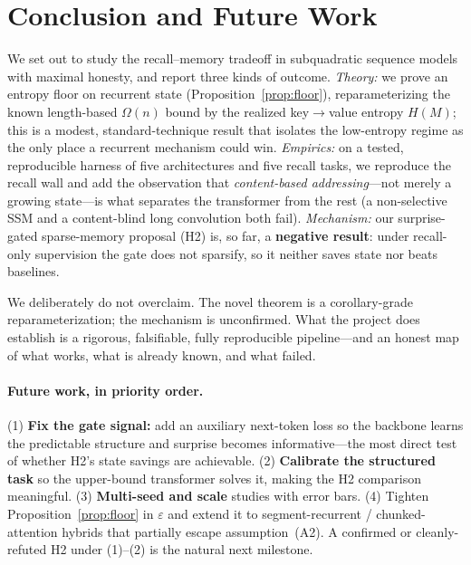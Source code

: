 \section{Conclusion and Future Work}
\label{sec:conclusion}

We set out to study the recall--memory tradeoff in subquadratic sequence models with maximal
honesty, and report three kinds of outcome. \emph{Theory:} we prove an entropy floor on recurrent
state (Proposition~\ref{prop:floor}), reparameterizing the known length-based $\Omega(n)$ bound by
the realized key$\rightarrow$value entropy $H(M)$; this is a modest, standard-technique result that
isolates the low-entropy regime as the only place a recurrent mechanism could win. \emph{Empirics:}
on a tested, reproducible harness of five architectures and five recall tasks, we reproduce the
recall wall and add the observation that \emph{content-based addressing}---not merely a growing
state---is what separates the transformer from the rest (a non-selective SSM and a content-blind
long convolution both fail). \emph{Mechanism:} our surprise-gated sparse-memory proposal (H2) is,
so far, a \textbf{negative result}: under recall-only supervision the gate does not sparsify, so it
neither saves state nor beats baselines.

We deliberately do not overclaim. The novel theorem is a corollary-grade reparameterization; the
mechanism is unconfirmed. What the project does establish is a rigorous, falsifiable, fully
reproducible pipeline---and an honest map of what works, what is already known, and what failed.

\paragraph{Future work, in priority order.}
(1) \textbf{Fix the gate signal:} add an auxiliary next-token loss so the backbone learns the
predictable structure and surprise becomes informative---the most direct test of whether H2's
state savings are achievable. (2) \textbf{Calibrate the structured task} so the upper-bound
transformer solves it, making the H2 comparison meaningful. (3) \textbf{Multi-seed and scale}
studies with error bars. (4) Tighten Proposition~\ref{prop:floor} in $\varepsilon$ and extend it
to segment-recurrent / chunked-attention hybrids that partially escape assumption~(A2). A
confirmed or cleanly-refuted H2 under (1)--(2) is the natural next milestone.
